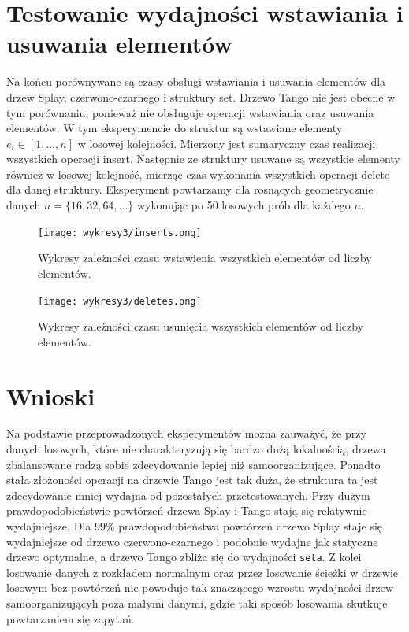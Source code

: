 \documentclass[declaration,shortabstract]{iithesis}
\theoremstyle{thm}
\theoremstyle{remark}
\theoremstyle{plain}
\theoremstyle{plain}
\theoremstyle{plain}
\begin{document}
\section{Testowanie wydajności wstawiania i usuwania elementów}
Na końcu porównywane są czasy obsługi wstawiania i usuwania elementów dla drzew Splay, czerwono-czarnego i struktury set. Drzewo Tango nie jest obecne w tym porównaniu, ponieważ nie obsługuje operacji wstawiania oraz usuwania elementów. W tym eksperymencie do struktur są wstawiane elementy \(e_i \in [1, ..., n]\) w losowej kolejności. Mierzony jest sumaryczny czas realizacji wszystkich operacji insert. Następnie ze struktury usuwane są wszystkie elementy również w losowej kolejność, mierząc czas wykonania wszystkich operacji delete dla danej struktury. Eksperyment powtarzamy dla rosnących geometrycznie danych \( n = \{16, 32, 64, ...\}\) wykonując po 50 losowych prób dla każdego $n$. \\
\begin{figure}[H]
\begin{minipage}[b]{.45\textwidth}
\centering
\texttt{[image: wykresy3/inserts.png]}
\caption{Wykresy zależności czasu wstawienia wszystkich elementów od liczby elementów. }
\end{minipage}
\hfill
\begin{minipage}[b]{.45\textwidth}
\centering
\texttt{[image: wykresy3/deletes.png]}
\caption{Wykresy zależności czasu usunięcia wszystkich elementów od liczby elementów. }
\end{minipage}
\end{figure}

\section{Wnioski}
Na podstawie przeprowadzonych eksperymentów można zauważyć, że przy danych losowych, które nie charakteryzują się bardzo dużą lokalnością, drzewa zbalansowane radzą sobie zdecydowanie lepiej niż samoorganizujące. Ponadto stała złożoności operacji na drzewie Tango jest tak duża, że struktura ta jest zdecydowanie mniej wydajna od pozostałych przetestowanych. Przy dużym prawdopodobieństwie powtórzeń drzewa Splay i Tango stają się relatywnie wydajniejsze. Dla $99\%$ prawdopodobieństwa powtórzeń drzewo Splay staje się wydajniejsze od drzewo czerwono-czarnego i podobnie wydajne jak statyczne drzewo optymalne, a drzewo Tango zbliża się do wydajności \texttt{seta}. Z kolei losowanie danych z rozkładem normalnym oraz przez losowanie ścieżki w drzewie losowym bez powtórzeń nie powoduje tak znaczącego wzrostu wydajności drzew samoorganizującyh poza małymi danymi, gdzie taki sposób losowania skutkuje powtarzaniem się zapytań.
\end{document}
